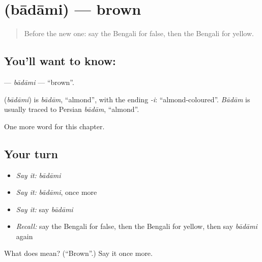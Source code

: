 \section[\texorpdfstring{\bn{বাদামি} (bādāmi)}{বাদামি (bādāmi)}]{ (bādāmi) — brown}

\label{lesson:BN-C77-badami}



\begin{quote}
Before the new one: say the Bengali for false, then the Bengali for yellow.
\end{quote}

\subsection*{You'll want to know: }
\textbf{} — \emph{bādāmi} — \textquotedblleft{}brown\textquotedblright{}.

\begin{cousinweb}
\textbf{} (\emph{bādāmi}) is \emph{bādām}, \textquotedblleft{}almond\textquotedblright{}, with the ending \emph{-i}: \textquotedblleft{}almond-coloured\textquotedblright{}. \emph{Bādām} is usually traced to Persian \emph{bādām}, \textquotedblleft{}almond\textquotedblright{}.
\end{cousinweb}

\begin{grammarlens}[title={What you've built}]
One more word for this chapter.
\end{grammarlens}

\subsection*{Your turn}
\begin{itemize}
\raggedright
  \item \emph{Say it:} \emph{bādāmi}
  \item \emph{Say it:} \emph{bādāmi}, once more
  \item \emph{Say it:} say \emph{bādāmi}
  \item \emph{Recall:} say the Bengali for false, then the Bengali for yellow, then say \emph{bādāmi} again
\end{itemize}

\begin{tcolorbox}[breakable,colback=teal!4,colframe=teal!35!black,title={Before you move on}]
What does  mean? (\textquotedblleft{}Brown\textquotedblright{}.) Say it once more.
\end{tcolorbox}

